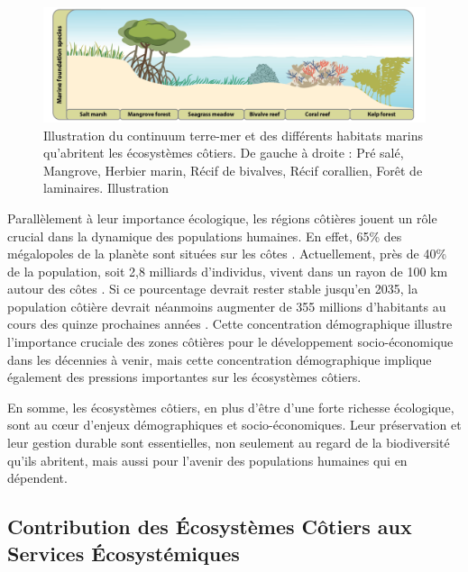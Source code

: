\begin{refsection}
\begin{figure}
\hypertarget{fig:intro1}{%
\centering
\includegraphics{02-Introduction/figures/Marine_Habitat_list.png}
\caption[Illustration du continuum terre-mer et des différents habitats
marins qu'abritent les écosystèmes côtiers]{Illustration du continuum terre-mer et des différents habitats
marins qu'abritent les écosystèmes côtiers. De gauche à droite : Pré
salé, Mangrove, Herbier marin, Récif de bivalves, Récif corallien, Forêt
de laminaires. Illustration \textcite{Wernberg_2023}}\label{fig:intro1}
}
\end{figure}

Parallèlement à leur importance écologique, les régions côtières jouent
un rôle crucial dans la dynamique des populations humaines. En effet,
65\% des mégalopoles de la planète sont situées sur les côtes
\autocite{Blackburn_2019}. Actuellement, près de 40\% de la population,
soit 2,8 milliards d'individus, vivent dans un rayon de 100 km autour
des côtes \autocite{Maul_2019}. Si ce pourcentage devrait rester stable
jusqu'en 2035, la population côtière devrait néanmoins augmenter de 355
millions d'habitants au cours des quinze prochaines années
\autocite{Maul_2019}. Cette concentration démographique illustre
l'importance cruciale des zones côtières pour le développement
socio-économique dans les décennies à venir, mais cette concentration
démographique implique également des pressions importantes sur les
écosystèmes côtiers.

En somme, les écosystèmes côtiers, en plus d'être d'une forte richesse
écologique, sont au cœur d'enjeux démographiques et socio-économiques.
Leur préservation et leur gestion durable sont essentielles, non
seulement au regard de la biodiversité qu'ils abritent, mais aussi pour
l'avenir des populations humaines qui en dépendent.

\hypertarget{contribution-des-uxe9cosystuxe8mes-cuxf4tiers-aux-services-uxe9cosystuxe9miques}{%
\subsection{Contribution des Écosystèmes Côtiers aux Services
Écosystémiques}\label{contribution-des-uxe9cosystuxe8mes-cuxf4tiers-aux-services-uxe9cosystuxe9miques}}


\end{refsection}
